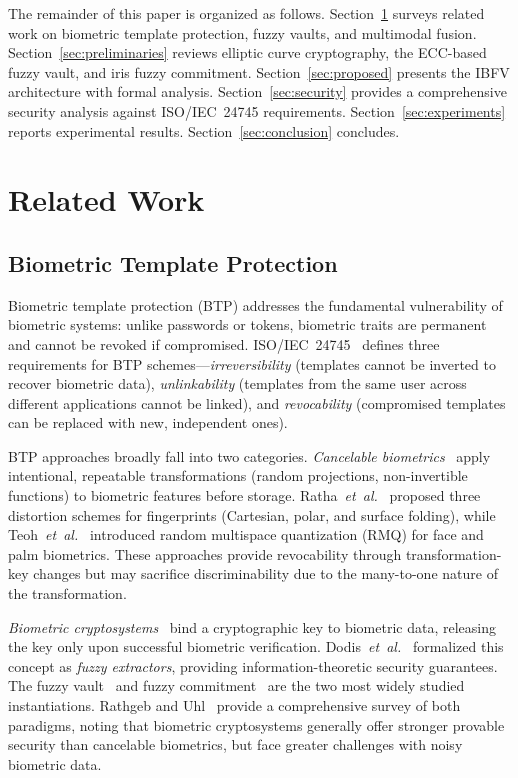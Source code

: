 \documentclass[conference]{IEEEtran}
\newcommand{\IBFV}{\textsf{IBFV}}
\begin{document}
The remainder of this paper is organized as follows. Section~\ref{sec:related} surveys related work on biometric template protection, fuzzy vaults, and multimodal fusion. Section~\ref{sec:preliminaries} reviews elliptic curve cryptography, the ECC-based fuzzy vault, and iris fuzzy commitment. Section~\ref{sec:proposed} presents the \IBFV{} architecture with formal analysis. Section~\ref{sec:security} provides a comprehensive security analysis against ISO/IEC~24745 requirements. Section~\ref{sec:experiments} reports experimental results. Section~\ref{sec:conclusion} concludes.

\section{Related Work}
\label{sec:related}

\subsection{Biometric Template Protection}

Biometric template protection (BTP) addresses the fundamental vulnerability of biometric systems: unlike passwords or tokens, biometric traits are permanent and cannot be revoked if compromised. ISO/IEC~24745~\cite{iso24745} defines three requirements for BTP schemes---\emph{irreversibility} (templates cannot be inverted to recover biometric data), \emph{unlinkability} (templates from the same user across different applications cannot be linked), and \emph{revocability} (compromised templates can be replaced with new, independent ones).

BTP approaches broadly fall into two categories. \emph{Cancelable biometrics}~\cite{ratha2007generating} apply intentional, repeatable transformations (random projections, non-invertible functions) to biometric features before storage. Ratha~\textit{et~al.}~\cite{ratha2007generating} proposed three distortion schemes for fingerprints (Cartesian, polar, and surface folding), while Teoh~\textit{et~al.}~\cite{teoh2004random} introduced random multispace quantization (RMQ) for face and palm biometrics. These approaches provide revocability through transformation-key changes but may sacrifice discriminability due to the many-to-one nature of the transformation.

\emph{Biometric cryptosystems}~\cite{jain2008biometric} bind a cryptographic key to biometric data, releasing the key only upon successful biometric verification. Dodis~\textit{et~al.}~\cite{dodis2008fuzzy} formalized this concept as \emph{fuzzy extractors}, providing information-theoretic security guarantees. The fuzzy vault~\cite{juels2002fuzzy} and fuzzy commitment~\cite{hao2006combining} are the two most widely studied instantiations. Rathgeb and Uhl~\cite{rathgeb2011survey} provide a comprehensive survey of both paradigms, noting that biometric cryptosystems generally offer stronger provable security than cancelable biometrics, but face greater challenges with noisy biometric data.
\end{document}
